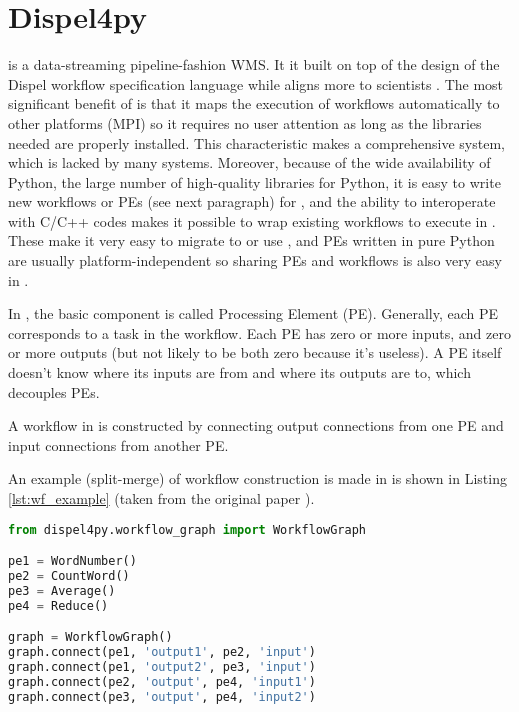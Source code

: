 \section{Dispel4py}
\Dpy is a data-streaming pipeline-fashion WMS. It it built on top of the design of the Dispel workflow specification language \cite{atkinson2012data} while aligns more to scientists \cite{doi:10.1177/1094342016649766}. The most significant benefit of \dpy is that it maps the execution of workflows automatically to other platforms (\eg MPI) so it requires no user attention as long as the libraries needed are properly installed. This characteristic makes \dpy a comprehensive system, which is lacked by many systems. Moreover, because of the wide availability of Python, the large number of high-quality libraries for Python, it is easy to write new workflows or PEs (see next paragraph) for \dpy, and the ability to interoperate with C/C++ codes makes it possible to wrap existing workflows to execute in \dpy. These make it very easy to migrate to or use \dpy, and  PEs written in pure Python are usually platform-independent so sharing PEs and workflows is also very easy in \dpy.

In \dpy, the basic component is called Processing Element (PE). Generally, each PE corresponds to a task in the workflow. Each PE has zero or more inputs, and zero or more outputs (but not likely to be both zero because it's useless). A PE itself doesn't know where its inputs are from and where its outputs are to, which decouples PEs.

A workflow in \dpy is constructed by connecting output connections from one PE and input connections from another PE.

An example (split-merge) of workflow construction is made in \dpy is shown in Listing \ref{lst:wf_example} (taken from the original \dpy paper \cite{doi:10.1177/1094342016649766}).

\begin{lstlisting}[frame=single,caption={Example code of workflow construction in \dpy},captionpos=b,label={lst:wf_example},language=Python]
from dispel4py.workflow_graph import WorkflowGraph

pe1 = WordNumber()
pe2 = CountWord()
pe3 = Average()
pe4 = Reduce()

graph = WorkflowGraph()
graph.connect(pe1, 'output1', pe2, 'input')
graph.connect(pe1, 'output2', pe3, 'input')
graph.connect(pe2, 'output', pe4, 'input1')
graph.connect(pe3, 'output', pe4, 'input2')
\end{lstlisting}

